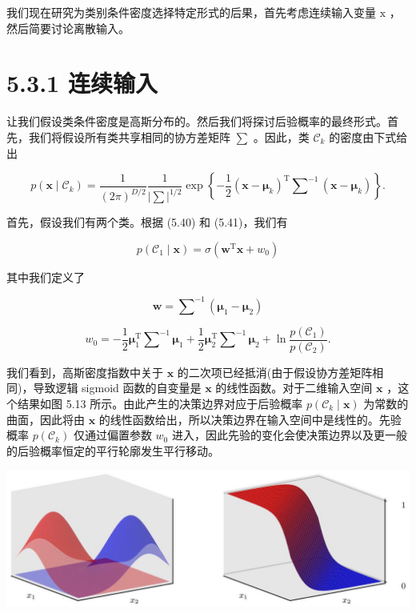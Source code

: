 \documentclass[10pt]{report}
\begin{document}
我们现在研究为类别条件密度选择特定形式的后果，首先考虑连续输入变量 \(\mathrm{x}\) ，然后简要讨论离散输入。

\section*{5.3.1 连续输入}

让我们假设类条件密度是高斯分布的。然后我们将探讨后验概率的最终形式。首先，我们将假设所有类共享相同的协方差矩阵 \(\mathbf{\sum }\) 。因此，类 \({\mathcal{C}}_{k}\) 的密度由下式给出

\[
p\left( {\mathbf{x} \mid  {\mathcal{C}}_{k}}\right)  = \frac{1}{{\left( 2\pi \right) }^{D/2}}\frac{1}{{\left| \mathbf{\sum }\right| }^{1/2}}\exp \left\{  {-\frac{1}{2}{\left( \mathbf{x} - {\mathbf{\mu }}_{k}\right) }^{\mathrm{T}}{\mathbf{\sum }}^{-1}\left( {\mathbf{x} - {\mathbf{\mu }}_{k}}\right) }\right\}  . \tag{5.47}
\]

首先，假设我们有两个类。根据 (5.40) 和 (5.41)，我们有

\[
p\left( {{\mathcal{C}}_{1} \mid  \mathbf{x}}\right)  = \sigma \left( {{\mathbf{w}}^{\mathrm{T}}\mathbf{x} + {w}_{0}}\right)  \tag{5.48}
\]

其中我们定义了

\[
\mathbf{w} = {\mathbf{\sum }}^{-1}\left( {{\mathbf{\mu }}_{1} - {\mathbf{\mu }}_{2}}\right)  \tag{5.49}
\]

\[
{w}_{0} =  - \frac{1}{2}{\mathbf{\mu }}_{1}^{\mathrm{T}}{\mathbf{\sum }}^{-1}{\mathbf{\mu }}_{1} + \frac{1}{2}{\mathbf{\mu }}_{2}^{\mathrm{T}}{\mathbf{\sum }}^{-1}{\mathbf{\mu }}_{2} + \ln \frac{p\left( {\mathcal{C}}_{1}\right) }{p\left( {\mathcal{C}}_{2}\right) }. \tag{5.50}
\]

我们看到，高斯密度指数中关于 \(\mathbf{x}\) 的二次项已经抵消(由于假设协方差矩阵相同)，导致逻辑 sigmoid 函数的自变量是 \(\mathbf{x}\) 的线性函数。对于二维输入空间 \(\mathbf{x}\) ，这个结果如图 5.13 所示。由此产生的决策边界对应于后验概率 \(p\left( {{\mathcal{C}}_{k} \mid  \mathbf{x}}\right)\) 为常数的曲面，因此将由 \(\mathbf{x}\) 的线性函数给出，所以决策边界在输入空间中是线性的。先验概率 \(p\left( {\mathcal{C}}_{k}\right)\) 仅通过偏置参数 \({w}_{0}\) 进入，因此先验的变化会使决策边界以及更一般的后验概率恒定的平行轮廓发生平行移动。

\begin{center}
\includegraphics[max width=1.0\textwidth]{images/0194e279-9b28-703a-88f4-c3ac21e2010d_172_244_352_1309_443_0.jpg}
\end{center}
\hspace*{3em} 
\end{document}
